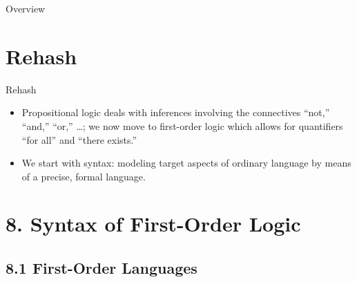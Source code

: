 
\begin{frame}
  \maketitle
\end{frame}

\begin{frame}{Overview}
  \setcounter{framenumber}{212}
  \tableofcontents
\end{frame}

\section{Rehash}
\begin{frame}{Rehash}
	
	\begin{itemize}%
	\itemsep=16pt
	
	\item Propositional logic deals with inferences involving the connectives ``not,'' ``and,'' ``or,'' \dots; \alert{we now move to first-order logic which allows for quantifiers ``for all'' and ``there exists.''}

	\item We start with syntax: modeling target aspects of ordinary language by means of a precise, formal language.
	
\end{itemize}

\end{frame}
		

\section{8. Syntax of First-Order Logic}
\subsection{8.1 First-Order Languages}


